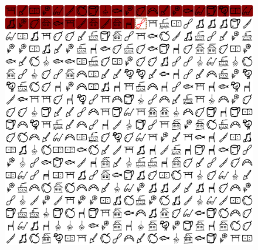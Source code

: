 \documentclass[12pt,a4paper]{article}
\begin{document}
\begin{figure}[!h]
    \centering
    \includegraphics[scale=0.4]{kitoltott.png}
\end{figure}
\end{document}
